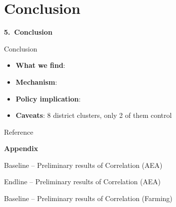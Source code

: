 \documentclass[aspectratio=169]{beamer}
\begin{document}
\section{Conclusion}
\begin{frame}[plain]
	\vfill
	\centering
	{\Huge\bfseries\textcolor{myGreen}{5.~Conclusion}}
	\vfill
\end{frame}
\begin{frame}{Conclusion}
\begin{itemize}
	\item \textbf{What we find}:
	\item \textbf{Mechanism}:
	\item \textbf{Policy implication}:
	\item \textbf{Caveats}: 8 district clusters, only 2 of them control
\end{itemize}
\end{frame}

\begin{frame}[allowframebreaks]{Reference}
	\printbibliography[heading=none]
\end{frame}

\appendix
\begin{frame}[plain]
	\vfill
	\centering
	{\Huge\bfseries\textcolor{myGreen}{Appendix}}
	\vfill
\end{frame}

\begin{frame}{Baseline -- Preliminary results of Correlation (AEA)}
	\centering
	
\end{frame}

\begin{frame}{Endline -- Preliminary results of Correlation (AEA)}
	\centering
	
\end{frame}

\begin{frame}{Baseline -- Preliminary results of Correlation (Farming)}
	\centering
	
\end{frame}
\end{document}
